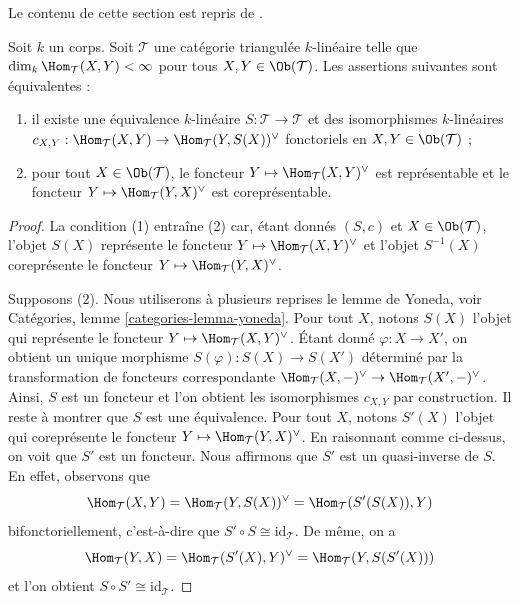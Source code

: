 \noindent
Le contenu de cette section est repris de \cite{Bondal-Kapranov}.

\begin{lemma}
\label{lemma-Serre-functor-exists}
Soit $k$ un corps. Soit $\mathcal{T}$ une catégorie triangulée
$k$-linéaire telle que $\dim_k \Hom_\mathcal{T}(X, Y) < \infty$
pour tous $X, Y \in \Ob(\mathcal{T})$. Les assertions suivantes sont équivalentes :
\begin{enumerate}
\item il existe une équivalence $k$-linéaire
$S : \mathcal{T} \to \mathcal{T}$ et des isomorphismes $k$-linéaires
$c_{X, Y} : \Hom_\mathcal{T}(X, Y) \to \Hom_\mathcal{T}(Y, S(X))^\vee$
fonctoriels en $X, Y \in \Ob(\mathcal{T})$ ;
\item pour tout $X \in \Ob(\mathcal{T})$,
le foncteur $Y \mapsto \Hom_\mathcal{T}(X, Y)^\vee$
est représentable et le foncteur $Y \mapsto \Hom_\mathcal{T}(Y, X)^\vee$
est coreprésentable.
\end{enumerate}
\end{lemma}

\begin{proof}
La condition (1) entraîne (2) car, étant donnés $(S, c)$ et $X \in \Ob(\mathcal{T})$,
l'objet $S(X)$ représente le foncteur
$Y \mapsto \Hom_\mathcal{T}(X, Y)^\vee$ et l'objet $S^{-1}(X)$ coreprésente
le foncteur $Y \mapsto \Hom_\mathcal{T}(Y, X)^\vee$.

\medskip\noindent
Supposons (2). Nous utiliserons à plusieurs reprises le lemme de Yoneda, voir
Catégories, lemme \ref{categories-lemma-yoneda}.
Pour tout $X$, notons $S(X)$ l'objet qui représente le
foncteur $Y \mapsto \Hom_\mathcal{T}(X, Y)^\vee$. Étant donné
$\varphi : X \to X'$, on obtient un unique morphisme $S(\varphi) : S(X) \to S(X')$
déterminé par la transformation de foncteurs correspondante
$\Hom_\mathcal{T}(X, -)^\vee \to \Hom_\mathcal{T}(X', -)^\vee$.
Ainsi, $S$ est un foncteur et l'on obtient les isomorphismes $c_{X, Y}$
par construction. Il reste à montrer que $S$ est une équivalence.
Pour tout $X$, notons $S'(X)$ l'objet qui coreprésente le
foncteur $Y \mapsto \Hom_\mathcal{T}(Y, X)^\vee$. En raisonnant comme
ci-dessus, on voit que $S'$ est un foncteur. Nous affirmons que $S'$
est un quasi-inverse de $S$. En effet, observons que
$$
\Hom_\mathcal{T}(X, Y) = \Hom_\mathcal{T}(Y, S(X))^\vee =
\Hom_\mathcal{T}(S'(S(X)), Y)
$$
bifonctoriellement, c'est-à-dire que $S' \circ S \cong \text{id}_\mathcal{T}$.
De même, on a
$$
\Hom_\mathcal{T}(Y, X) = \Hom_\mathcal{T}(S'(X), Y)^\vee =
\Hom_\mathcal{T}(Y, S(S'(X)))
$$
et l'on obtient $S \circ S' \cong \text{id}_\mathcal{T}$.
\end{proof}


